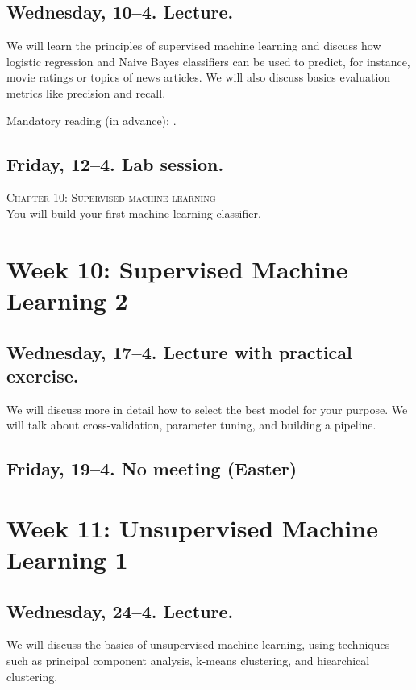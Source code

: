 \documentclass[a4paper,10pt]{report}
\begin{document}
\subsection*{Wednesday, 10--4. Lecture.}
We will learn the principles of supervised machine learning and discuss how logistic regression and Naive Bayes classifiers can be used to predict, for instance, movie ratings or topics of news articles. We will also discuss basics evaluation metrics like precision and recall.

Mandatory reading (in advance): \cite{burscher2014}. 

\subsection*{Friday, 12--4. Lab session.}
\textsc{ Chapter 10: Supervised machine learning}\\
You will build your first machine learning classifier.



\section*{Week 10: Supervised Machine Learning 2}

\subsection*{Wednesday, 17--4. Lecture with practical exercise.}
We will discuss more in detail how to select the best model for your purpose. We will talk about cross-validation, parameter tuning, and building a pipeline.

\subsection*{Friday, 19--4. No meeting (Easter)}




\section*{Week 11: Unsupervised Machine Learning 1}

\subsection*{Wednesday, 24--4. Lecture.}
We will discuss the basics of unsupervised machine learning, using techniques such as principal component analysis, k-means clustering, and hiearchical clustering.
\end{document}
